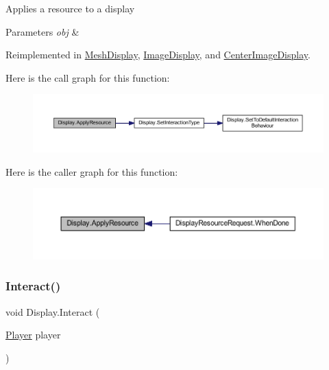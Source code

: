 Applies a resource to a display 


\begin{DoxyParams}{Parameters}
{\em obj} & \\
\hline
\end{DoxyParams}


Reimplemented in \mbox{\hyperlink{class_mesh_display_ab9a24f407a8ff995658097a98242095e}{Mesh\+Display}}, \mbox{\hyperlink{class_image_display_ab4cae8c66db7e7d77ab117fe24e63980}{Image\+Display}}, and \mbox{\hyperlink{class_center_image_display_a140b8b82522c1aedb473b3cd532dcd34}{Center\+Image\+Display}}.

Here is the call graph for this function\+:
\nopagebreak
\begin{figure}[H]
\begin{center}
\leavevmode
\includegraphics[width=350pt]{class_display_a811157ddb42ae4d72f690457a08711d3_cgraph}
\end{center}
\end{figure}
Here is the caller graph for this function\+:
\nopagebreak
\begin{figure}[H]
\begin{center}
\leavevmode
\includegraphics[width=350pt]{class_display_a811157ddb42ae4d72f690457a08711d3_icgraph}
\end{center}
\end{figure}
\mbox{\label{class_display_a43fc2a6f19bbf2f1bdb676392b37e921}} 
\subsubsection{\texorpdfstring{Interact()}{Interact()}}
{\footnotesize\ttfamily void Display.\+Interact (\begin{DoxyParamCaption}\item[{\mbox{\hyperlink{class_player}{Player}}}]{player }\end{DoxyParamCaption})}



